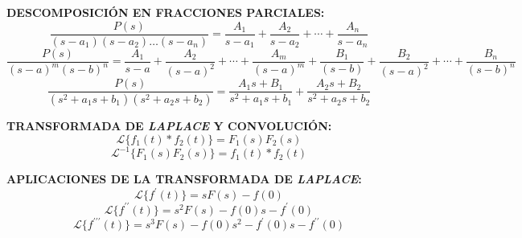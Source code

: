 \documentclass[letter,twoside,8pt]{article}
\begin{document}
\textbf{DESCOMPOSICIÓN EN FRACCIONES PARCIALES:}
\begin{equation*}
    \frac{P(s)}{(s-a_1)(s-a_2)\dots(s-a_n)}
        =\frac{A_1}{s-a_1}+\frac{A_2}{s-a_2}+\cdots+\frac{A_n}{s-a_n}
\end{equation*}
\begin{equation*}
    \frac{P(s)}{{(s-a)}^m{(s-b)}^n}
        =\frac{A_1}{s-a}+\frac{A_2}{{(s-a)}^2}+\cdots+\frac{A_m}{{(s-a)}^m}
        +\frac{B_1}{(s-b)}+\frac{B_2}{{(s-a)}^2}+\cdots+\frac{B_n}{{(s-b)}^n}
\end{equation*}
\begin{equation*}
    \frac{P(s)}{(s^2+{a_1}s+b_1)(s^2+{a_2}s+b_2)}
        =\frac{{A_1}s+B_1}{s^2+{a_1}s+b_1}
        +\frac{{A_2}s+B_2}{s^2+{a_2}s+b_2}
\end{equation*}

\textbf{TRANSFORMADA DE \emph{LAPLACE} Y CONVOLUCIÓN:}
\begin{equation*}
    \mathcal{L}\{f_1(t)*f_2(t)\}=F_1(s)F_2(s)
\end{equation*}
\begin{equation*}
    \mathcal{L}^{-1}\{F_1(s)F_2(s)\}=f_1(t)*f_2(t)
\end{equation*}

\textbf{APLICACIONES DE LA TRANSFORMADA DE \emph{LAPLACE}:}
\begin{equation*}
    \mathcal{L}\{f^{\prime}(t)\}=sF(s)-f(0)
\end{equation*}
\begin{equation*}
    \mathcal{L}\{f^{\prime\prime}(t)\}=s^2F(s)-f(0)s-f^{\prime}(0)
\end{equation*}
\begin{equation*}
    \mathcal{L}\{f^{\prime\prime\prime}(t)\}=s^3F(s)-f(0)s^2-f^{\prime}(0)s-f^{\prime\prime}(0)
\end{equation*}
\end{document}
